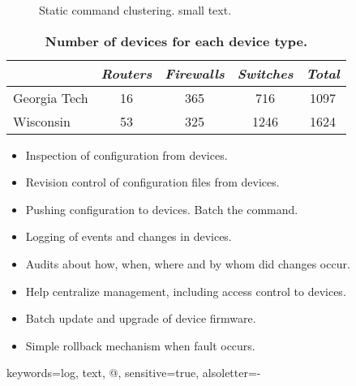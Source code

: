 
\begin{figure}[t]
\caption{Static command clustering.
\textmd{small text.}}
\label{fig:statemachine}
\end{figure}



\begin{table}[t] 
\begin{center}
\begin{small}
\begin{tabular}{l|c|c|c|c} 
& \em Routers & \em Firewalls & \em Switches & {\em Total}  \\ \hline
Georgia Tech & 16 & 365 & 716 & 1097 \\
Wisconsin & 53 & 325 & 1246 & 1624 \\
\end{tabular} 
\caption{\bf Number of devices for each device type.}
\label{tab:sample_network} 
\end{small}
\end{center}
\end{table}



\begin{itemize}
\itemsep=-1pt
\item Inspection of configuration from devices.
\item Revision control of configuration files from devices.
\item Pushing configuration to devices. Batch the command.
\item Logging of events and changes in devices.
\item Audits about how, when, where and by whom did changes occur. 
\item Help centralize management, including access control to devices.
\item Batch update and upgrade of device firmware.
\item Simple rollback mechanism when fault occurs.
\end{itemize}



{keywords={log, text, @}, sensitive=true, alsoletter={-}}

